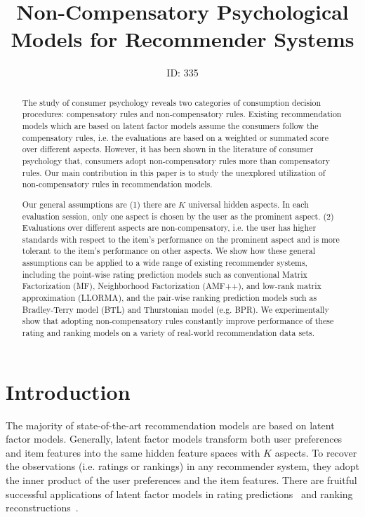\documentclass[letterpaper]{article} %
\begin{document}
%
\title{Non-Compensatory Psychological Models for Recommender Systems}
\author{ID: 335
}
\maketitle
\begin{abstract}
The study of consumer psychology reveals two categories of consumption decision procedures: compensatory rules and non-compensatory rules. Existing recommendation models which are based on latent factor models assume the consumers follow the compensatory rules, i.e. the evaluations are based on a weighted or summated score over different aspects. However, it has been shown in the literature of consumer psychology that, consumers adopt non-compensatory rules more than compensatory rules. Our main contribution in this paper is to study the unexplored utilization of non-compensatory rules in recommendation models. 

Our general assumptions are (1) there are $K$ universal hidden aspects. In each evaluation session, only one aspect is chosen by the user as the prominent aspect. (2) Evaluations over different aspects are non-compensatory, i.e. the user has higher standards with respect to the item's performance on the prominent aspect and is more tolerant to the item's performance on other aspects. We show how these general assumptions can be applied to a wide range of existing recommender systems, including the point-wise rating prediction models such as conventional Matrix Factorization (MF), Neighborhood Factorization (AMF++), and low-rank matrix approximation (LLORMA), and the pair-wise ranking prediction models such as Bradley-Terry model (BTL) and Thurstonian model (e.g. BPR).  We experimentally show that adopting non-compensatory rules constantly improve performance of these rating  and ranking models on a variety of real-world recommendation data sets.
\end{abstract}



\section{Introduction}\label{sec:introduction}
The majority of state-of-the-art recommendation models are based on latent factor models. Generally, latent factor models transform both user preferences and item features into the same hidden feature spaces with $K$ aspects. To recover the observations (i.e. ratings or rankings) in any recommender system, they adopt the inner product of the user preferences and the item features. There are fruitful successful applications of latent factor models in  rating predictions~\cite{Koren2009Matrix,Koren2010Factor,Lee2014Local} and ranking reconstructions~\cite{Rendle2009BPR,Steck2015Gaussian,Zhao2018Factored,Shi2010List}.   
\end{document}
